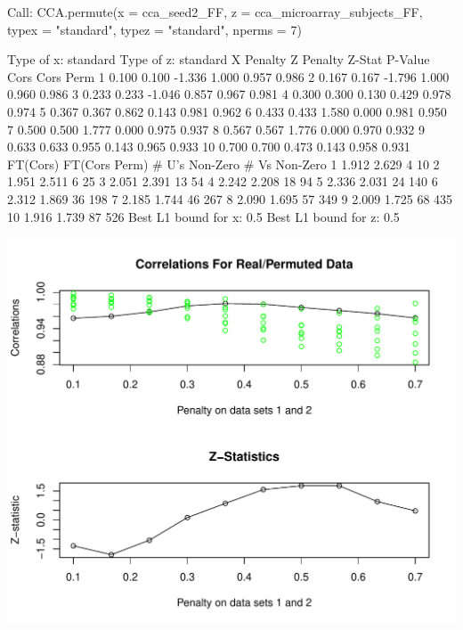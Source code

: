 \documentclass{article}\usepackage[]{graphicx}\usepackage[]{color}
\makeatletter
\def\maxwidth{ %
  \ifdim\Gin@nat@width>\linewidth
    \linewidth
  \else
    \Gin@nat@width
  \fi
}
\makeatother
\begin{document}
\begin{Schunk}
\begin{Soutput}
Call: CCA.permute(x = cca_seed2_FF, z = cca_microarray_subjects_FF, 
    typex = "standard", typez = "standard", nperms = 7)

Type of x:  standard 
Type of z:  standard 
   X Penalty Z Penalty Z-Stat P-Value  Cors Cors Perm
1      0.100     0.100 -1.336   1.000 0.957     0.986
2      0.167     0.167 -1.796   1.000 0.960     0.986
3      0.233     0.233 -1.046   0.857 0.967     0.981
4      0.300     0.300  0.130   0.429 0.978     0.974
5      0.367     0.367  0.862   0.143 0.981     0.962
6      0.433     0.433  1.580   0.000 0.981     0.950
7      0.500     0.500  1.777   0.000 0.975     0.937
8      0.567     0.567  1.776   0.000 0.970     0.932
9      0.633     0.633  0.955   0.143 0.965     0.933
10     0.700     0.700  0.473   0.143 0.958     0.931
   FT(Cors) FT(Cors Perm) # U's Non-Zero # Vs Non-Zero
1     1.912         2.629              4            10
2     1.951         2.511              6            25
3     2.051         2.391             13            54
4     2.242         2.208             18            94
5     2.336         2.031             24           140
6     2.312         1.869             36           198
7     2.185         1.744             46           267
8     2.090         1.695             57           349
9     2.009         1.725             68           435
10    1.916         1.739             87           526
Best L1 bound for x:  0.5
Best L1 bound for z:  0.5
\end{Soutput}


{\centering \includegraphics[width=\maxwidth]{figure/Nov_9-2} 

}
\end{Schunk}
\end{document}
